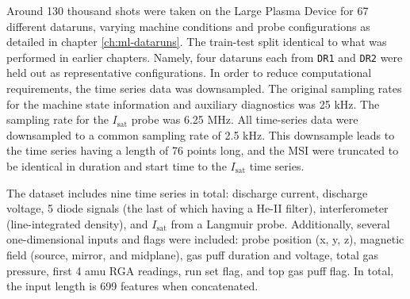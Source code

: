 Around 130 thousand shots were taken on the Large Plasma Device for 67 different dataruns, varying machine conditions and probe configurations as detailed in chapter \ref{ch:ml-dataruns}. The train-test split identical to what was performed in earlier chapters. Namely, four dataruns each from \texttt{DR1} and \texttt{DR2} were held out as representative configurations. In order to reduce computational requirements, the time series data was downsampled. The original sampling rates for the machine state information and auxiliary diagnostics was 25 kHz. The sampling rate for the $I_\text{sat}$ probe was 6.25 MHz. All time-series data were downsampled to a common sampling rate of 2.5 kHz. This downsample leads to the time series having a length of 76 points long, and the MSI were truncated to be identical in duration and start time to the $I_\text{sat}$ time series.

The dataset includes nine time series in total: discharge current, discharge voltage, 5 diode signals (the last of which having a He-II filter), interferometer (line-integrated density), and $I_\text{sat}$ from a Langmuir probe. Additionally, several one-dimensional inputs and flags were included: probe position (x, y, z), magnetic field (source, mirror, and midplane), gas puff duration and voltage, total gas pressure, first 4 amu RGA readings, run set flag, and top gas puff flag. In total, the input length is 699 features when concatenated. 


